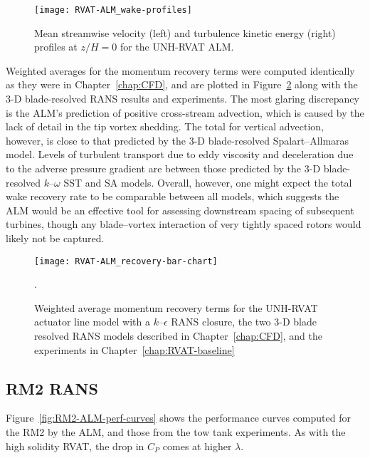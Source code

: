 \begin{figure}
    \centering
    
    \texttt{[image: RVAT-ALM\_wake-profiles]}
    
    \caption{Mean streamwise velocity (left) and turbulence kinetic energy
        (right) profiles at $z/H=0$ for the UNH-RVAT ALM.}
    
    \label{fig:RVAT-ALM-profiles}
\end{figure}

Weighted averages for the momentum recovery terms were computed identically as
they were in Chapter~\ref{chap:CFD}, and are plotted in
Figure~\ref{fig:RVAT-ALM-recovery} along with the 3-D blade-resolved RANS
results and experiments. The most glaring discrepancy is the ALM's prediction of
positive cross-stream advection, which is caused by the lack of detail in the
tip vortex shedding. The total for vertical advection, however, is close to that
predicted by the 3-D blade-resolved Spalart--Allmaras model. Levels of turbulent
transport due to eddy viscosity and deceleration due to the adverse pressure
gradient are between those predicted by the 3-D blade-resolved $k$--$\omega$ SST
and SA models. Overall, however, one might expect the total wake recovery rate
to be comparable between all models, which suggests the ALM would be an
effective tool for assessing downstream spacing of subsequent turbines, though
any blade--vortex interaction of very tightly spaced rotors would likely not be
captured.

\begin{figure}
    \centering
    
    \texttt{[image: RVAT-ALM\_recovery-bar-chart]}

    \caption{Weighted average momentum recovery terms for the UNH-RVAT actuator
        line model with a $k$--$\epsilon$ RANS closure, the two 3-D blade resolved
        RANS models described in Chapter~\ref{chap:CFD}, and the experiments in
        Chapter~\ref{chap:RVAT-baseline}}.
    
    \label{fig:RVAT-ALM-recovery}
\end{figure}


\subsection{RM2 RANS}

Figure~\ref{fig:RM2-ALM-perf-curves} shows the performance curves computed for
the RM2 by the ALM, and those from the tow tank experiments. As with the high
solidity RVAT, the drop in $C_P$ comes at higher $\lambda$.

